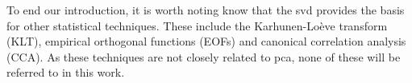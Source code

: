 To end our introduction, it is worth noting know that the \gls{svd} provides the basis for other statistical techniques.
These include the Karhunen-Loève transform (KLT), empirical orthogonal functions (EOFs) and canonical correlation analysis (CCA).
As these techniques are not closely related to \gls{pca}, none of these will be referred to in this work.





\clearpage





